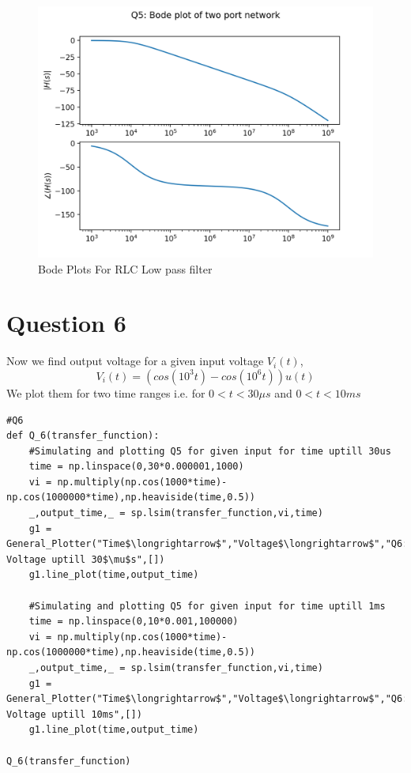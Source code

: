 \documentclass[11pt, a4paper]{article}
\begin{document}
\begin{figure}[h!]
\includegraphics[scale=0.6]{Q5.png}
\centering
\caption{Bode Plots For RLC Low pass filter}
\label{fig:Bode Plots For RLC Low pass filter}
\end{figure}

\section{Question 6}
Now we find output voltage for a given input voltage $V_i(t)$,
\begin{equation}
V_i(t) = (cos(10^3t) - cos(10^6t))u(t)
\end{equation}
We plot them for two time ranges i.e. for $0<t<30\mu s$ and $0<t<10ms$

\begin{lstlisting}
#Q6
def Q_6(transfer_function):
	#Simulating and plotting Q5 for given input for time uptill 30us 
	time = np.linspace(0,30*0.000001,1000)
	vi = np.multiply(np.cos(1000*time)-np.cos(1000000*time),np.heaviside(time,0.5))
	_,output_time,_ = sp.lsim(transfer_function,vi,time)
	g1 = General_Plotter("Time$\longrightarrow$","Voltage$\longrightarrow$","Q6: Voltage uptill 30$\mu$s",[])
	g1.line_plot(time,output_time)
	
	#Simulating and plotting Q5 for given input for time uptill 1ms
	time = np.linspace(0,10*0.001,100000)
	vi = np.multiply(np.cos(1000*time)-np.cos(1000000*time),np.heaviside(time,0.5))
	_,output_time,_ = sp.lsim(transfer_function,vi,time)
	g1 = General_Plotter("Time$\longrightarrow$","Voltage$\longrightarrow$","Q6: Voltage uptill 10ms",[])
	g1.line_plot(time,output_time)

Q_6(transfer_function)
\end{lstlisting}
\end{document}
